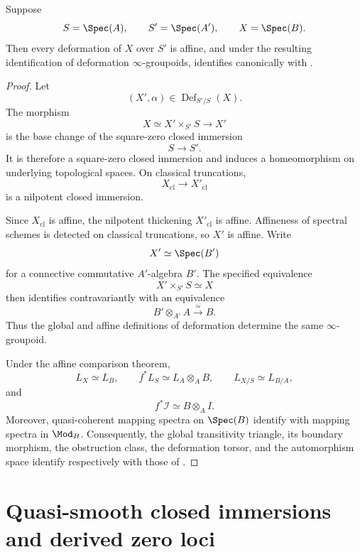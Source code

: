 \begin{corollary}
\label{cor:global-obstruction-affine-compatibility}
Suppose
\[
    S=\Spec(A),
    \qquad
    S'=\Spec(A'),
    \qquad
    X=\Spec(B).
\]
Then every deformation of \(X\) over \(S'\) is affine, and under the
resulting identification of deformation \(\infty\)-groupoids,
identifies canonically with
.
\end{corollary}

\begin{proof}
Let
\[
    (X',\alpha)
    \in
    \operatorname{Def}_{S'/S}(X).
\]
The morphism
\[
    X
    \simeq
    X'\times_{S'}S
    \longrightarrow
    X'
\]
is the base change of the square-zero closed immersion
\[
    S
    \longrightarrow
    S'.
\]
It is therefore a square-zero closed immersion and induces a
homeomorphism on underlying topological spaces. On classical
truncations,
\[
    X_{\mathrm{cl}}
    \longrightarrow
    X'_{\mathrm{cl}}
\]
is a nilpotent closed immersion.

Since \(X_{\mathrm{cl}}\) is affine, the nilpotent thickening
\(X'_{\mathrm{cl}}\) is affine. Affineness of spectral schemes is
detected on classical truncations, so \(X'\) is affine. Write
\[
    X'
    \simeq
    \Spec(B')
\]
for a connective commutative \(A'\)-algebra \(B'\). The specified
equivalence
\[
    X'\times_{S'}S
    \simeq
    X
\]
then identifies contravariantly with an equivalence
\[
    B'\otimes_{A'}A
    \xrightarrow{\simeq}
    B.
\]
Thus the global and affine definitions of deformation determine the same
\(\infty\)-groupoid.

Under the affine comparison theorem,
\[
    L_X
    \simeq
    L_B,
    \qquad
    f^*L_S
    \simeq
    L_A\otimes_AB,
    \qquad
    L_{X/S}
    \simeq
    L_{B/A},
\]
and
\[
    f^*\mathcal I
    \simeq
    B\otimes_AI.
\]
Moreover, quasi-coherent mapping spectra on \(\Spec(B)\) identify with
mapping spectra in \(\Mod_B\). Consequently, the global transitivity
triangle, its boundary morphism, the obstruction class, the deformation
torsor, and the automorphism space identify respectively with those of
.
\end{proof}

\section{Quasi-smooth closed immersions and derived zero loci}
\label{sec:quasi-smooth-closed-immersions}

